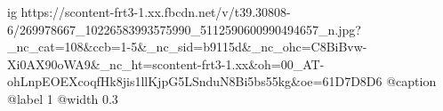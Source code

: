  
 
 
 
 

\ifcmt
  ig https://scontent-frt3-1.xx.fbcdn.net/v/t39.30808-6/269978667_10226583993575990_5112590600990494657_n.jpg?_nc_cat=108&ccb=1-5&_nc_sid=b9115d&_nc_ohc=C8BiBvw-Xi0AX90oWA9&_nc_ht=scontent-frt3-1.xx&oh=00_AT-ohLnpEOEXcoqfHk8jis1llKjpG5LSnduN8Bi5bs55kg&oe=61D7D8D6
  @caption @label 1
  @width 0.3

\fi
